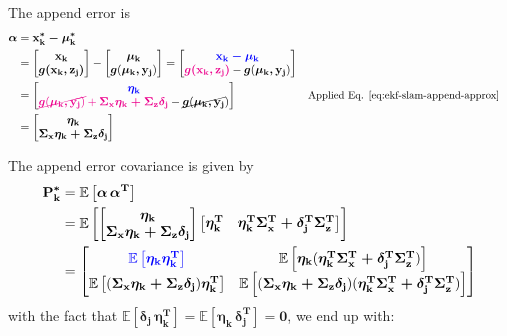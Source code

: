 \documentclass[12pt]{article}
\newcommand{\bvec}[1]{\boldsymbol{\mathbf{#1}}} %
\newcommand{\bvecT}[1]{\boldsymbol{\mathbf{#1^T}}} %
\newcommand{\mat}[1]{\boldsymbol{\mathbf{#1}}}
\newcommand{\brac}[1]{\left[#1\right]} %
\newcommand{\mb}[1]{{\boldsymbol{#1}}} %
\newcommand{\expv}[1]{\mathbb{E}\brac{#1}} %
\newcommand{\blue}[1]{\color{blue}#1\color{black}}
\newcommand{\magenta}[1]{\color{magenta}#1\color{black}}
\begin{document}
The append error is 
\begin{equation}
\begin{aligned}
   \bvec{\alpha} &= \bvec{x_k^* - \mu_k^*}\\
   &= \begin{bmatrix}
       \bvec{x_k} \\ \mb{g(\bvec{x_k, z_j})}
   \end{bmatrix} - \begin{bmatrix}
       \bvec{\mu_k} \\ \mb{g}(\bvec{\mu_k, y_j})
   \end{bmatrix} = \begin{bmatrix}
       \blue{\bvec{x_k - \mu_k}}\\
       \magenta{\mb{g(\bvec{x_k, z_j})}} - \mb{g}(\bvec{\mu_k, y_j})
   \end{bmatrix}\\
   &= \begin{bmatrix}
       \blue{\bvec{\eta_k}} \\
       \magenta{\cancel{\mb{g}(\bvec{\mu_k, y_j})} + 
       \mat{\Sigma_x \eta_k + \Sigma_z \delta_j}} 
       - \cancel{\mb{g}(\bvec{\mu_k, y_j}})
   \end{bmatrix} && \small\text{Applied Eq. 
   \ref{eq:ekf-slam-append-approx}}\\
    &= \begin{bmatrix}
       \bvec{\eta_k} \\
       \mat{\Sigma_x \eta_k + \Sigma_z \delta_j}
   \end{bmatrix}
\end{aligned}
\end{equation}

The append error covariance is given by
\begin{equation}
\begin{aligned}
    \mat{P_k^*} &= \expv{\bvec{\alpha} \,\bvecT{\alpha}}\\
    &= \expv{\begin{bmatrix}
        \bvec{\eta_k} \\ \mat{\Sigma_x \eta_k + \Sigma_z \delta_j}
    \end{bmatrix} \begin{bmatrix}
        \bvecT{\eta_k} & \mat{\eta_k^T \Sigma_x^T + \delta_j^T \Sigma_z^T}
    \end{bmatrix}}\\
    &= \begin{bmatrix}
        \blue{\expv{\bvec{\eta_k}\bvecT{\eta_k}}} & \expv{\bvec{\eta_k} 
        (\mat{\eta_k^T \Sigma_x^T + \delta_j^T \Sigma_z^T})} \\
        \expv{(\mat{\Sigma_x \eta_k + \Sigma_z \delta_j})\bvecT{\eta_k}} & 
        \expv{(\mat{\Sigma_x \eta_k + \Sigma_z \delta_j})(\mat{\eta_k^T 
        \Sigma_x^T + \delta_j^T \Sigma_z^T})}
    \end{bmatrix}\\
    \end{aligned}
\end{equation}
with the fact that $\expv{\bvec{\delta_j \, \eta_k^T}} = \expv{\bvec{\eta_k \,
\delta_j^T}} = \bvec{0}$, we end up with:
\end{document}
